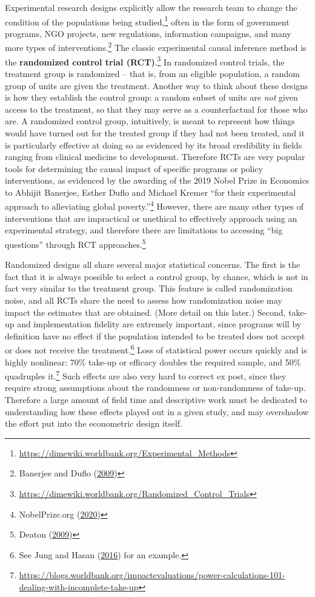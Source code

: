 \documentclass[
]{book}
\begin{document}
Experimental research designs explicitly allow the research team
to change the condition of the populations being studied,\footnote{\url{https://dimewiki.worldbank.org/Experimental_Methods}}
often in the form of government programs, NGO projects, new regulations,
information campaigns, and many more types of interventions.\footnote{Banerjee and Duflo (\protect\hyperlink{ref-banerjee2009experimental}{2009})}
The classic experimental causal inference method
is the \textbf{randomized control trial (RCT)}.\footnote{\url{https://dimewiki.worldbank.org/Randomized_Control_Trials}}
In randomized control trials, the treatment group is randomized --
that is, from an eligible population,
a random group of units are given the treatment.
Another way to think about these designs is how they establish the control group:
a random subset of units are \emph{not} given access to the treatment,
so that they may serve as a counterfactual for those who are.
A randomized control group, intuitively, is meant to represent
how things would have turned out for the treated group
if they had not been treated, and it is particularly effective at doing so
as evidenced by its broad credibility in fields ranging from clinical medicine to development.
Therefore RCTs are very popular tools for determining the causal impact
of specific programs or policy interventions,
as evidenced by the awarding of the 2019 Nobel Prize in Economics
to Abhijit Banerjee, Esther Duflo and Michael Kremer
``for their experimental approach to alleviating global poverty.''\footnote{NobelPrize.org (\protect\hyperlink{ref-nobel2019}{2020})}
However, there are many other types of interventions that are impractical or unethical
to effectively approach using an experimental strategy,
and therefore there are limitations to accessing ``big questions''
through RCT approaches.\footnote{Deaton (\protect\hyperlink{ref-deaton2009}{2009})}

Randomized designs all share several major statistical concerns.
The first is the fact that it is always possible to select a control group,
by chance, which is not in fact very similar to the treatment group.
This feature is called randomization noise, and all RCTs share the need to assess
how randomization noise may impact the estimates that are obtained.
(More detail on this later.)
Second, take-up and implementation fidelity are extremely important,
since programs will by definition have no effect
if the population intended to be treated
does not accept or does not receive the treatment.\footnote{See Jung and Hasan (\protect\hyperlink{ref-jung2016impact}{2016}) for an example.}
Loss of statistical power occurs quickly and is highly nonlinear:
70\% take-up or efficacy doubles the required sample, and 50\% quadruples it.\footnote{\url{https://blogs.worldbank.org/impactevaluations/power-calculations-101-dealing-with-incomplete-take-up}}
Such effects are also very hard to correct ex post,
since they require strong assumptions about the randomness or non-randomness of take-up.
Therefore a large amount of field time and descriptive work
must be dedicated to understanding how these effects played out in a given study,
and may overshadow the effort put into the econometric design itself.
\end{document}
